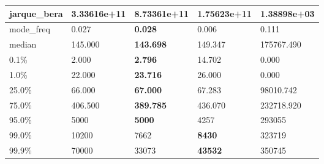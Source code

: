\begin{table}[H]
\begin{tabular}{|l|m{10em}|m{10em}|m{10em}|m{10em}|}
\hline jarque\_bera & 3.33616e+11 & \cellcolor[rgb]{0.9, 0.54, 0.52} 8.73361e+11 & \bfseries 1.75623e+11 & 1.38898e+03 \\
\hline mode\_freq & 0.027 & \bfseries 0.028 & 0.006 & \cellcolor[rgb]{0.9, 0.54, 0.52} 0.111 \\
\hline median & 145.000 & \bfseries 143.698 & 149.347 & \cellcolor[rgb]{0.9, 0.54, 0.52} 175767.490 \\
\hline 0.1\% & 2.000 & \bfseries 2.796 & \cellcolor[rgb]{0.9, 0.54, 0.52} 14.702 & 0.000 \\
\hline 1.0\% & 22.000 & \bfseries 23.716 & 26.000 & \cellcolor[rgb]{0.9, 0.54, 0.52} 0.000 \\
\hline 25.0\% & 66.000 & \bfseries 67.000 & 67.283 & \cellcolor[rgb]{0.9, 0.54, 0.52} 98010.742 \\
\hline 75.0\% & 406.500 & \bfseries 389.785 & 436.070 & \cellcolor[rgb]{0.9, 0.54, 0.52} 232718.920 \\
\hline 95.0\% & 5000 & \bfseries 5000 & 4257 & \cellcolor[rgb]{0.9, 0.54, 0.52} 293055 \\
\hline 99.0\% & 10200 & 7662 & \bfseries 8430 & \cellcolor[rgb]{0.9, 0.54, 0.52} 323719 \\
\hline 99.9\% & 70000 & 33073 & \bfseries 43532 & \cellcolor[rgb]{0.9, 0.54, 0.52} 350745 \\
\hline
\end{tabular}
\end{table}
